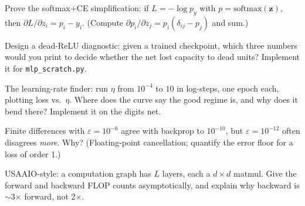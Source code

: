 \begin{exercise}[{[hard]}]
Prove the softmax+CE simplification: if $L=-\log p_y$ with
$p=\mathrm{softmax}(\mathbf z)$, then
$\partial L/\partial z_i=p_i-y_i$. (Compute
$\partial p_i/\partial z_j=p_i(\delta_{ij}-p_j)$ and sum.)
\end{exercise}
\begin{exercise}[{[hard]}]
Design a dead-ReLU diagnostic: given a trained checkpoint, which
three numbers would you print to decide whether the net lost capacity
to dead units? Implement it for \texttt{mlp\_scratch.py}.
\end{exercise}
\begin{exercise}[{[hard]}]
The learning-rate finder: run $\eta$ from $10^{-4}$ to $10$ in
log-steps, one epoch each, plotting loss vs.\ $\eta$. Where does the
curve say the good regime is, and why does it bend there? Implement it
on the digits net.
\end{exercise}
\begin{exercise}[{[hard]}]
Finite differences with $\varepsilon=10^{-6}$ agree with backprop to
$10^{-10}$, but $\varepsilon=10^{-12}$ often disagrees
\emph{more}. Why? (Floating-point cancellation; quantify the error
floor for a loss of order 1.)
\end{exercise}
\begin{exercise}[{[hard]}]
USAAIO-style: a computation graph has $L$ layers, each a
$d\times d$ matmul. Give the forward and backward FLOP counts
asymptotically, and explain why backward is $\sim$3$\times$ forward,
not 2$\times$.
\end{exercise}

